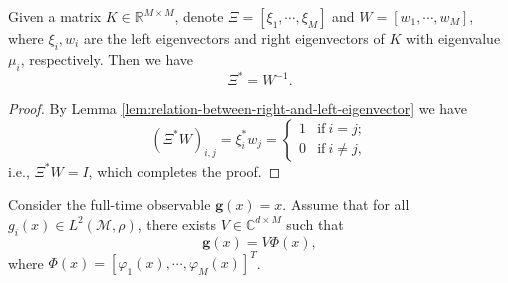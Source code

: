 \begin{proposition}
  Given a matrix $K \in \mathbb{R}^{M \times M}$,
  denote $\Xi = [\xi_1,\cdots,\xi_M]$ and $W = [w_1,\cdots,w_M]$,
  where $\xi_i, w_i$ are the left eigenvectors and right eigenvectors
  of $K$ with eigenvalue $\mu_i$, respectively.
  Then we have
  \begin{equation}
    \label{eq:relation-between-right-and-left-eigenvector-matrix}
    \Xi^{\ast} = W^{-1}.
  \end{equation}
\end{proposition}

\begin{proof}
  By Lemma \ref{lem:relation-between-right-and-left-eigenvector}
  we have
  \begin{equation*}
  (\Xi^{\ast}W)_{i,j} = \xi_i^{\ast} w_j =
  \begin{cases}
    1 & \text{if} ~ i = j;\\
    0 & \text{if} ~ i \neq j,
  \end{cases}
  \end{equation*}
  i.e., $\Xi^{\ast}W = I$, which completes the proof.
\end{proof}

\begin{proposition}
  Consider the full-time observable $\mathbf{g}(x) = x$.
  Assume that for all $g_i(x) \in L^2(\mathcal{M}, \rho)$,
  there exists $V \in \mathbb{C}^{d \times M}$ such that
  \begin{equation*}
    \mathbf{g}(x) = V \Phi(x),
  \end{equation*}
  where $\Phi(x) = [\varphi_1(x),\cdots,\varphi_M(x)]^T$.
\end{proposition}

